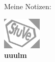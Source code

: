 
{

\thispagestyle{empty}

Meine Notizen:

\clearpage
\thispagestyle{empty}
\null
\vspace{16.5cm}
\begin{center}
	\includegraphics[keepaspectratio, width=5em]{./grafiken/stuve_logo_gedreht-leicht_grau.png}\\
	\textcolor{black!40}{\large \textbf{uuulm}}
\end{center}

\restoregeometry
}